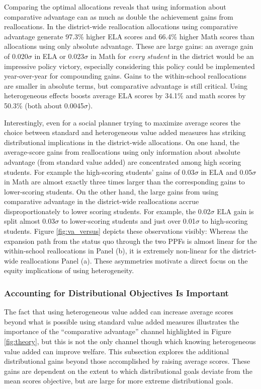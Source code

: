 \documentclass[12pt]{article}
\theoremstyle{definition}
\theoremstyle{definition}
\theoremstyle{definition}
\theoremstyle{definition}
\begin{document}
Comparing the optimal allocations reveals that using information about comparative advantage can as much as double the achievement gains from reallocations. In the district-wide reallocation allocations using comparative advantage generate 97.3\% higher ELA scores and 66.4\% higher Math scores than allocations using only absolute advantage. These are large gains: an average gain of 0.020$\sigma$ in ELA or 0.023$\sigma$ in Math for \textit{every student} in the district would be an impressive policy victory, especially considering this policy could be implemented year-over-year for compounding gains. Gains to the within-school reallocations are smaller in absolute terms, but comparative advantage is still critical. Using heterogeneous effects boosts average ELA scores by 34.1\% and math scores by 50.3\% (both about 0.0045$\sigma$).

Interestingly, even for a social planner trying to maximize average scores the choice between standard and heterogeneous value added measures has striking distributional implications in the district-wide allocations. On one hand, the average-score gains from reallocations using only information about absolute advantage (from standard value added) are concentrated among high scoring students. For example the high-scoring students' gains of 0.03$\sigma$ in ELA  and 0.05$\sigma$ in Math are almost exactly three times larger than the corresponding gains to lower-scoring students.  On the other hand, the large gains from using comparative advantage in the  district-wide reallocations accrue disproportionately to lower scoring students. For example, the 0.02$\sigma$ ELA gain is split almost 0.03$\sigma$ to lower-scoring students and just over 0.01$\sigma$ to high-scoring students. Figure \ref{fig:va_versus} depicts these observations visibly: Whereas the expansion path from the status quo through the two PPFs is almost linear for the within-school reallocations in Panel (b), it is extremely non-linear for the district-wide reallocations Panel (a). These asymmetries motivate a direct focus on the equity implications of using heterogeneity.



\subsubsection{Accounting for Distributional Objectives Is Important}

The fact that using heterogeneous value added can increase average scores beyond what is possible using standard value added measures illustrates the importance of the ``comparative advantage'' channel highlighted in Figure \ref{fig:theory}, but this is not the only channel though which knowing heterogeneous value added can improve welfare. This subsection explores the additional distributional gains beyond those accomplished by raising average scores. These gains are dependent on the extent to which distributional goals deviate from the mean scores objective, but are large for more extreme distributional goals. 
\end{document}
